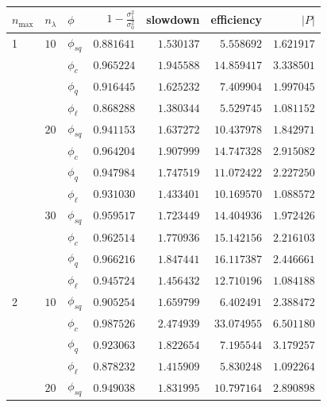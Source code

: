 \begin{table}[htb]
  \centering
  \begin{tabular}{l@{\hskip 12pt}l@{\hskip 12pt}l@{\hskip
    12pt}r@{\hskip 12pt}r@{\hskip 12pt}r@{\hskip 12pt}r}
    \toprule
    $n_{\max}$ &   $n_{\lambda}$ & $\phi$ &
    $1-\frac{\sigma_1^2}{\sigma_0^2}$ &  slowdown &  efficiency
    &$\lvert P\rvert$ \\\midrule
    \num{1} & $10$ &$\phi_{sq}$ &  $0.881641$ &  $1.530137$ &
    $5.558692$ &   $1.621917$ \\
    &    &$\phi_{c}$ &  $0.965224$ &  $1.945588$ &   $14.859417$ &
    $3.338501$ \\
    &    &$\phi_{q}$ &  $0.916445$ &  $1.625232$ &    $7.409904$ &
    $1.997045$ \\
    &    & $\phi_{\ell}$ &  $0.868288$ &  $1.380344$ &    $5.529745$
    &   $1.081152$ \\\cmidrule{2-7}
    & $20$ &$\phi_{sq}$ &  $0.941153$ &  $1.637272$ &   $10.437978$ &
    $1.842971$ \\
    &    &$\phi_{c}$ &  $0.964204$ &  $1.907999$ &   $14.747328$ &
    $2.915082$ \\
    &    &$\phi_{q}$ &  $0.947984$ &  $1.747519$ &   $11.072422$ &
    $2.227250$ \\
    &    & $\phi_{\ell}$ &  $0.931030$ &  $1.433401$ &   $10.169570$
    &   $1.088572$ \\\cmidrule{2-7}
    & $30$ &$\phi_{sq}$ &  $0.959517$ &  $1.723449$ &   $14.404936$ &
    $1.972426$ \\
    &    &$\phi_{c}$ &  $0.962514$ &  $1.770936$ &   $15.142156$ &
    $2.216103$ \\
    &    &$\phi_{q}$ &  $0.966216$ &  $1.847441$ &   $16.117387$ &
    $2.446661$ \\
    &    & $\phi_{\ell}$ &  $0.945724$ &  $1.456432$ &   $12.710196$
    &   $1.084188$ \\\midrule
    \num{2} & $10$ &$\phi_{sq}$ &  $0.905254$ &  $1.659799$ &
    $6.402491$ &   $2.388472$ \\
    &    &$\phi_{c}$ &  $0.987526$ &  $2.474939$ &   $33.074955$ &
    $6.501180$ \\
    &    &$\phi_{q}$ &  $0.923063$ &  $1.822654$ &    $7.195544$ &
    $3.179257$ \\
    &    & $\phi_{\ell}$ &  $0.878232$ &  $1.415909$ &    $5.830248$
    &   $1.092264$ \\\cmidrule{2-7}
    & $20$ &$\phi_{sq}$ &  $0.949038$ &  $1.831995$ &   $10.797164$ &
    $2.890898$ \\

\end{tabular}
\end{table}
